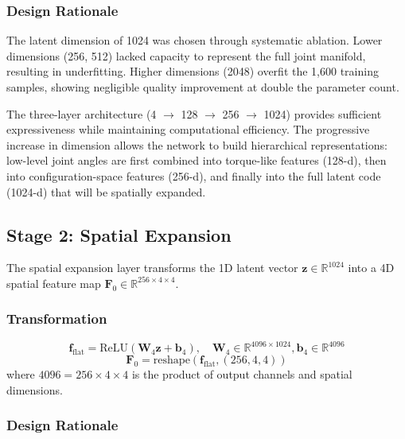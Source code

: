 \documentclass[12pt,a4paper,oneside]{report}
\begin{document}
\subsubsection{Design Rationale}

The latent dimension of 1024 was chosen through systematic ablation. Lower dimensions (256, 512) lacked capacity to represent the full joint manifold, resulting in underfitting. Higher dimensions (2048) overfit the 1,600 training samples, showing negligible quality improvement at double the parameter count.

The three-layer architecture (4 $\rightarrow$ 128 $\rightarrow$ 256 $\rightarrow$ 1024) provides sufficient expressiveness while maintaining computational efficiency. The progressive increase in dimension allows the network to build hierarchical representations: low-level joint angles are first combined into torque-like features (128-d), then into configuration-space features (256-d), and finally into the full latent code (1024-d) that will be spatially expanded.

\subsection{Stage 2: Spatial Expansion}

The spatial expansion layer transforms the 1D latent vector $\mathbf{z} \in \mathbb{R}^{1024}$ into a 4D spatial feature map $\mathbf{F}_0 \in \mathbb{R}^{256 \times 4 \times 4}$.

\subsubsection{Transformation}

\begin{equation}
\mathbf{f}_{\text{flat}} = \text{ReLU}(\mathbf{W}_4 \mathbf{z} + \mathbf{b}_4), \quad \mathbf{W}_4 \in \mathbb{R}^{4096 \times 1024}, \mathbf{b}_4 \in \mathbb{R}^{4096}
\end{equation}
\begin{equation}
\mathbf{F}_0 = \text{reshape}(\mathbf{f}_{\text{flat}}, (256, 4, 4))
\end{equation}
where $4096 = 256 \times 4 \times 4$ is the product of output channels and spatial dimensions.

\subsubsection{Design Rationale}
\end{document}
